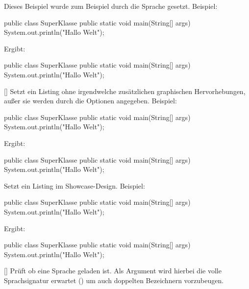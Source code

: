 Dieses Beispiel wurde zum Beispiel durch die Sprache  gesetzt. Beispiel:
\begin{latex}
\begin{java}
public class SuperKlasse {
    public static void main(String[] args) {
        System.out.println("Hallo Welt");
    }
}
\end{java}
\end{latex}
Ergibt:
\begin{java}
public class SuperKlasse {
    public static void main(String[] args) {
        System.out.println("Hallo Welt");
    }
}
\end{java}
%
%
%
[]
Setzt ein Listing ohne irgendwelche zusätzlichen graphischen Hervorhebungen, außer sie werden durch die Optionen angegeben. Beispiel:
\begin{latex}
\begin{plainjava}
public class SuperKlasse {
    public static void main(String[] args) {
        System.out.println("Hallo Welt");
    }
}
\end{plainjava}
\end{latex}
Ergibt:
\begin{plainjava}
public class SuperKlasse {
    public static void main(String[] args) {
        System.out.println("Hallo Welt");
    }
}
\end{plainjava}
%
%
%
Setzt ein Listing im Showcase-Design. Beispiel:
\begin{latex}
\begin{sjava}
public class SuperKlasse {
    public static void main(String[] args) {
        System.out.println("Hallo Welt");
    }
}
\end{sjava}
\end{latex}
Ergibt:
\begin{sjava}
public class SuperKlasse {
    public static void main(String[] args) {
        System.out.println("Hallo Welt");
    }
}
\end{sjava}

[]
Prüft ob eine Sprache geladen ist. Als Argument wird hierbei die volle Sprachsignatur erwartet () um auch doppelten Bezeichnern vorzubeugen.

